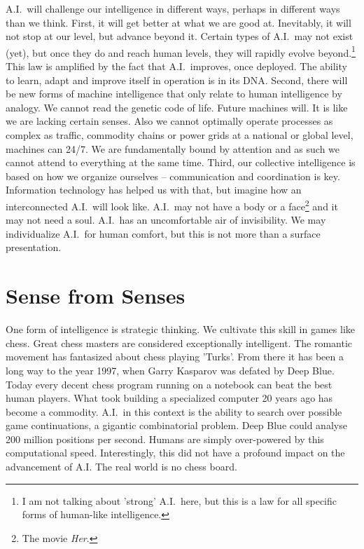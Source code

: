 \documentclass[a4]{article}
\begin{document}
\noindent A.I.~will challenge our intelligence in different ways, perhaps in different ways than we think. First, it will get better at what we are good at. Inevitably, it will not stop at our level, but advance beyond it. Certain types of A.I.~may not exist (yet), but once they do and reach human levels, they will rapidly evolve beyond.\footnote{I am not talking about 'strong' A.I.~here, but this is a law for all specific forms of human-like intelligence.} This law is amplified by the fact that A.I.~improves, once deployed. The ability to learn, adapt and improve itself in operation is in its DNA. Second, there will be new forms of machine intelligence that only relate to human intelligence by analogy. We cannot read the genetic code of life. Future machines will. It is like we are lacking certain senses. Also we cannot optimally operate processes as complex as traffic, commodity chains or power grids at a national or global level, machines can 24/7. We are fundamentally bound by attention and as such we cannot attend to everything at the same time. Third, our collective intelligence is based on how we organize ourselves -- communication and coordination is key. Information technology has helped us with that, but imagine how an interconnected A.I.~will look like. A.I.~may not have a body or a face\footnote{The movie \textit{Her}.} and it may not need a soul. A.I.~has an uncomfortable air of invisibility. We may individualize A.I.~for human comfort, but this is not more than a surface presentation. 

\section{Sense from Senses}

One form of intelligence is strategic thinking. We cultivate this skill in games like chess. Great chess masters are considered exceptionally intelligent. The romantic movement has fantasized about chess playing 'Turks'. From there  it has been a long way to the year 1997, when Garry Kasparov was defated by Deep Blue. Today every decent chess program running on a notebook can beat the best human players. What took building a specialized computer 20 years ago has become a commodity. A.I.~in this context is the ability to search over possible game continuations, a gigantic combinatorial problem. Deep Blue could analyse 200 million positions per second. Humans are simply over-powered by this computational speed. Interestingly, this did not have a profound impact on the advancement of A.I. The real world is no chess board. \\
\end{document}
